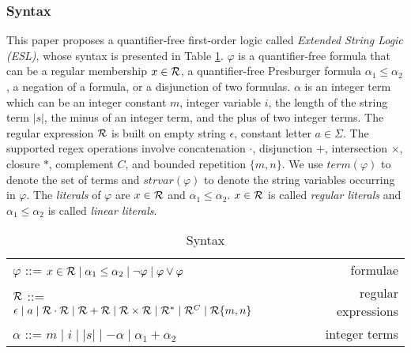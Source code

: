 \documentclass{standalone}
\begin{document}
\subsubsection{Syntax}
This paper proposes a quantifier-free first-order logic called \textit{Extended String Logic (ESL)}, whose syntax is presented in Table \ref{tab:syntax}. $\varphi$ is a quantifier-free formula that can be a regular membership $x\in\mathcal{R}$, a quantifier-free Presburger formula $\alpha_1 \leq \alpha_2$, a negation of a formula, or a disjunction of two formulas. $\alpha$ is an integer term which can be an integer constant $m$, integer variable $i$, the length of the string term $|s|$, the minus of an integer term, and the plus of two integer terms. The regular expression $\mathcal{R}$ is built on empty string $\epsilon$, constant letter $a\in \Sigma$. The supported regex operations involve concatenation $\cdot$, disjunction $+$, intersection $\times$, closure $*$, complement $C$, and bounded repetition $\{m, n\}$. We use $term(\varphi)$ to denote the set of terms and $strvar(\varphi)$ to denote the string variables occurring in $\varphi$. The \emph{literals} of $\varphi$ are $x\in \mathcal{R}$ and $\alpha_1 \leq \alpha_2$. $x\in \mathcal{R}$ is called \emph{regular literals} and $\alpha_1 \leq \alpha_2$ is called \emph{linear literals}.
\begin{table}[h]
  \centering
  \begin{tabular}{l r}
    $\varphi$ ::= $x\in \mathcal{R} \mid \alpha_1\leq\alpha_2 \mid \neg\varphi\mid \varphi\vee\varphi$                                             & formulae            \\
    $\mathcal{R}$ ::= $\epsilon\mid a\mid \mathcal{R}\cdot\mathcal{R}\mid \mathcal{R}+\mathcal{R}\mid \mathcal{R}\times \mathcal{R}\mid \mathcal{R}^*\mid\mathcal{R}^C \mid \mathcal{R}\{m,n\}$ & regular expressions \\
    $\alpha$ ::= $m \mid i \mid  |s|\mid -\alpha\mid \alpha_1+\alpha_2$                                                                       & integer terms
  \end{tabular}
  \caption{Syntax}\label{tab:syntax}
\end{table}
\end{document}
